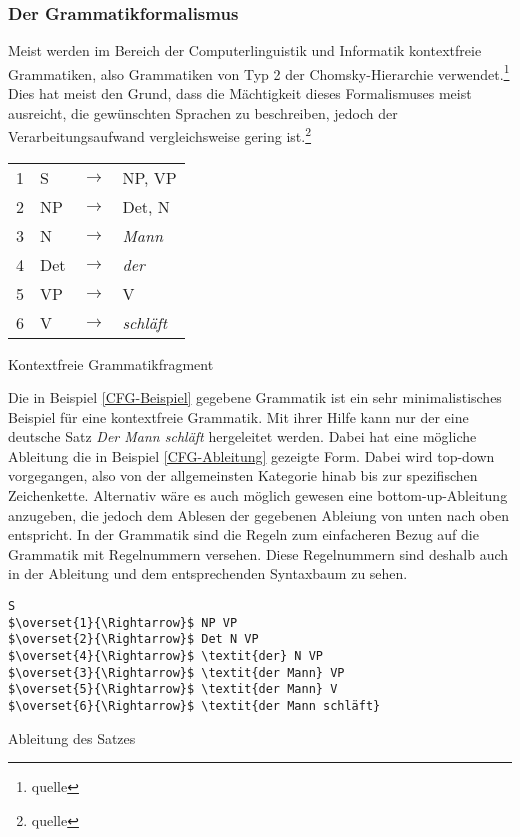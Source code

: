\documentclass[12pt,abstract=on]{scrreprt}
\begin{document}
\subsubsection{Der Grammatikformalismus}
Meist werden im Bereich der Computerlinguistik und Informatik kontextfreie Grammatiken, also Grammatiken von Typ 2 der Chomsky-Hierarchie verwendet.\footnote{quelle} Dies hat meist den Grund, dass die Mächtigkeit dieses Formalismuses meist ausreicht, die gewünschten Sprachen zu beschreiben, jedoch der Verarbeitungsaufwand vergleichsweise gering ist.\footnote{quelle}
\begin{program}[h]
\begin{tabular}{llll}
1 & S & $\longrightarrow$ & NP, VP \\
2 & NP & $\longrightarrow$ & Det, N \\
3 & N & $\longrightarrow$ & \textit{Mann} \\
4 & Det & $\longrightarrow$ & \textit{der} \\
5 & VP & $\longrightarrow$ & V \\
6 & V  & $\longrightarrow$ & \textit{schläft} \\
\end{tabular}
\caption{Kontextfreie Grammatikfragment}
\label{CFG-Beispiel}
\end{program}
Die in Beispiel \ref{CFG-Beispiel} gegebene Grammatik ist ein sehr minimalistisches Beispiel für eine kontextfreie Grammatik. Mit ihrer Hilfe kann nur der eine deutsche Satz \textit{Der Mann schläft} hergeleitet werden. Dabei hat eine mögliche Ableitung die in Beispiel \ref{CFG-Ableitung} gezeigte Form. Dabei wird top-down vorgegangen, also von der allgemeinsten Kategorie hinab bis zur spezifischen Zeichenkette. Alternativ wäre es auch möglich gewesen eine bottom-up-Ableitung anzugeben, die jedoch dem Ablesen der gegebenen Ableiung von unten nach oben entspricht. In der Grammatik sind die Regeln zum einfacheren Bezug auf die Grammatik mit Regelnummern versehen. Diese Regelnummern sind deshalb auch in der Ableitung und dem entsprechenden Syntaxbaum zu sehen. \par
\begin{program}[h]
\begin{Verbatim}[commandchars=\\\{\},codes={\catcode`$=3\catcode`^=7}] 
S
$\overset{1}{\Rightarrow}$ NP VP
$\overset{2}{\Rightarrow}$ Det N VP
$\overset{4}{\Rightarrow}$ \textit{der} N VP
$\overset{3}{\Rightarrow}$ \textit{der Mann} VP
$\overset{5}{\Rightarrow}$ \textit{der Mann} V
$\overset{6}{\Rightarrow}$ \textit{der Mann schläft}
\end{Verbatim}
\caption{Ableitung des Satzes}
\label{CFG-Ableitung}
\end{program}
\end{document}
